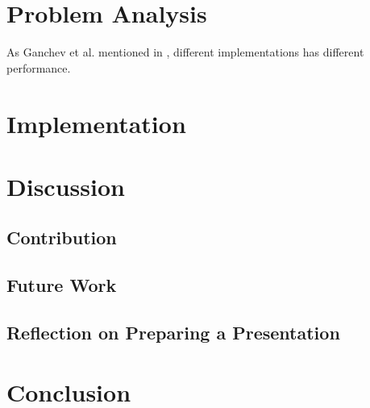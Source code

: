 \documentclass[whitelogo,12pt]{tudelft-report}
\begin{document}
\chapter{Problem Analysis}
As Ganchev et al. mentioned in \cite{ganchev2005}, different implementations has different performance.
\chapter{Implementation}

\chapter{Discussion}
\section{Contribution}
\section{Future Work}
\section{Reflection on Preparing a Presentation}


\chapter{Conclusion}





\appendix

%


\end{document}
